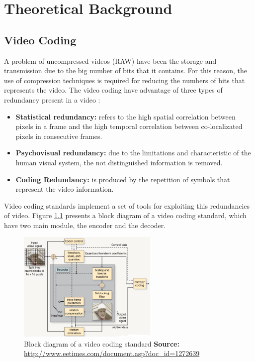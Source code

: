 \chapter{Theoretical Background}
\label{chap:background}

\section{Video Coding}

A problem of uncompressed videos (RAW) have been the storage and transmission
due to the big number of bits that it contains. For this reason, the use of
compression techniques is required for reducing the numbers of bits that
represents the video. The video coding have advantage of three types of
redundancy present in a video \cite{motion}:

\begin{itemize}
  \item \textbf{Statistical redundancy:} refers to the high spatial correlation
  between pixels in a frame and the high temporal correlation between
  co-localizated pixels in consecutive frames.
  \item \textbf{Psychovisual redundancy:} due to the limitations and
  characteristic of the human visual system, the not distinguished information
  is removed.
  \item \textbf{Coding Redundancy:} is produced by the repetition of symbols
  that represent the video information.
\end{itemize}

Video coding standards implement a set of tools for exploiting this redundancies
of video. Figure \ref{codec} presents a block diagram of a video coding
standard, which have two main module, the encoder and the decoder.

\begin{figure}[!h]
\centering
\includegraphics[width=0.6\textwidth]{images/codec.png}
\caption[Block diagram of a video coding standard]{Block diagram of a video coding standard
\scriptsize{\textbf{Source:}
\url{http://www.eetimes.com/document.asp?doc_id=1272639}}}
\label{codec}
\end{figure}

